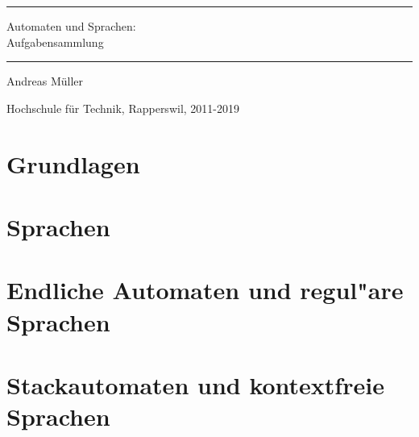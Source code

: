 \documentclass[a4paper,12pt]{book}
\begin{document}
\pagestyle{fancy}
\rhead{}
\frontmatter
\newcommand\HRule{\noindent\rule{\linewidth}{1.5pt}}
\begin{titlepage}
\HRule
\vspace*{2pt}
\begin{flushright}
{\Huge
Automaten und Sprachen:\\
\bigskip
Aufgabensammlung}
\end{flushright}
\HRule
\begin{flushright}
\vspace{30pt}
\LARGE
Andreas Müller
\end{flushright}
\begin{center}
Hochschule für Technik, Rapperswil, 2011-2019
\end{center}
\end{titlepage}
\hypersetup{
        colorlinks=true,
        linktoc=all,
        linkcolor=blue
}
\tableofcontents
\newenvironment{beispiel}[1][Beispiel]{%
\begin{proof}[#1]%
\renewcommand{\qedsymbol}{$\bigcirc$}
}{\end{proof}}
\mainmatter

\allowdisplaybreaks
\openthemaindex
{}



\chapter{Grundlagen}

\chapter{Sprachen}

\chapter{Endliche Automaten und regul"are Sprachen}

\chapter{Stackautomaten und kontextfreie Sprachen}

\end{document}
